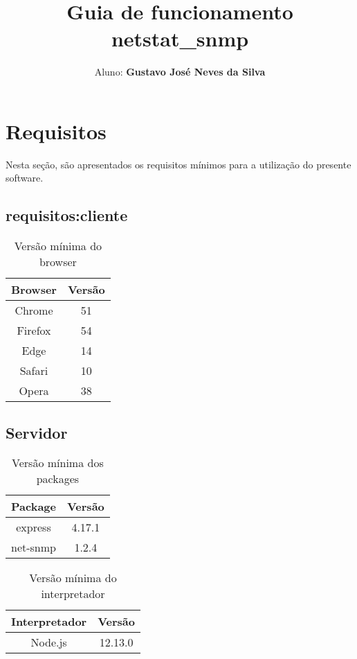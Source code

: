 \documentclass[10pt]{article}
\title{Guia de funcionamento\\netstat\_snmp}
\author{Aluno: \textbf{Gustavo José Neves da Silva}}
\begin{document}
    
    \date{}
    
    \maketitle
    
    \newpage
    \tableofcontents 
    \newpage
    
    
\section{Requisitos} \label{requisitos}
Nesta seção, são apresentados os requisitos mínimos para a utilização do presente software.
	\subsection{requisitos:cliente}
		\begin{table}[h]
  			\centering
   			\begin{tabular}{| c | c |}     
      			\hline
      			\textbf{Browser} & \textbf{Versão} \\ \hline \hline
      			Chrome & 51 \\ \hline
	  			Firefox & 54 \\ \hline
	  			Edge & 14 \\ \hline
	  			Safari & 10 \\ \hline
	  			Opera & 38 \\ \hline
    		\end{tabular}
    		\caption{Versão mínima do browser}
    		\label{tabela:Browser}
		\end{table}
		
	\subsection{Servidor} \label{requisitos:servidor}
		\begin{table}[h]
   			\centering
   			\begin{tabular}{| c | c |}     
      			\hline
      			\textbf{Package} & \textbf{Versão} \\ \hline \hline
      			express & 4.17.1 \\ \hline
	  			net-snmp & 1.2.4 \\ \hline
    		\end{tabular}
    		\caption{Versão mínima dos packages}
    		\label{tabela:Packages}
		\end{table}
		
		\begin{table}[h]
   			\centering
   			\begin{tabular}{| c | c |}     
      			\hline
      			\textbf{Interpretador} & \textbf{Versão} \\ \hline \hline
      			Node.js & 12.13.0 \\ \hline
    		\end{tabular}
    		\caption{Versão mínima do interpretador}
    		\label{tabela:Node}
		\end{table}
		
\end{document}
